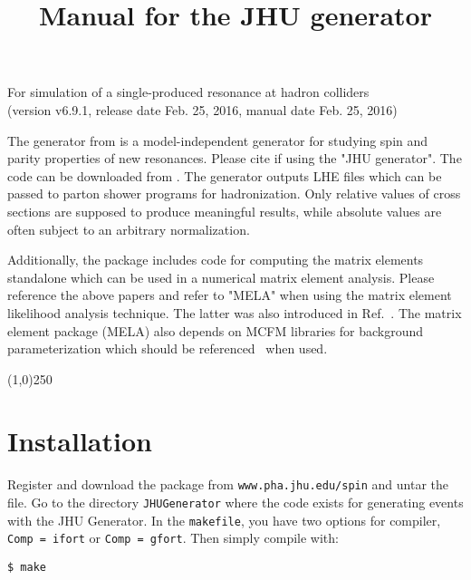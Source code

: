 \documentclass[aps,superscriptaddress,nofootinbib]{revtex4}
\begin{document}
\vspace{0.6cm}

\title{
\large
Manual for the JHU generator
}
\maketitle
\begin{center}
\small
For simulation of a single-produced resonance at hadron colliders \\
(version v6.9.1, release date Feb. 25, 2016, manual date Feb. 25, 2016) \\
\normalsize
\end{center}

\noindent
The generator from \cite{Gao:2010qx,Bolognesi:2012,Anderson:2013} is a model-independent generator for studying spin and parity properties of new resonances.
Please cite \cite{Gao:2010qx,Bolognesi:2012,Anderson:2013} if using the "JHU generator".
The code can be downloaded from \cite{thesite}.
The generator outputs LHE files which can be passed to parton shower programs for hadronization.
Only relative values of cross sections are supposed to produce meaningful results, while absolute values are often subject to an arbitrary normalization.

Additionally, the package includes code for computing the matrix elements standalone which can be used in a numerical matrix element analysis.
Please reference the above papers and refer to "MELA" when using the matrix element likelihood analysis technique.
The latter was also introduced in Ref.~\cite{Chatrchyan:2012ufa}. The matrix element package (MELA) also depends
on MCFM libraries for background parameterization which should be referenced~\cite{Campbell:2010ff} when used.

\vspace{0.5cm}
\begin{center}
\line(1,0){250}
\end{center}
\vspace{0.5cm}
\tableofcontents
\begin{center}
\end{center}
\vspace{0.5cm}


\section{ Installation }

\noindent
Register and download the package from \verb|www.pha.jhu.edu/spin| and untar the file.  Go to the directory \verb|JHUGenerator| where the code exists for generating events with the JHU Generator. In the \verb|makefile|, you have two options for compiler, \verb|Comp = ifort| or \verb|Comp = gfort|.  Then simply compile with:
\begin{verbatim}
$ make
\end{verbatim}
\end{document}
